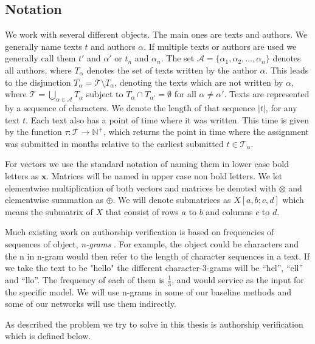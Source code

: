 \subsection{Notation} \label{subsec:notation}

We work with several different objects. The main ones are texts and authors.
We generally name texts $t$ and authors $\alpha$. If multiple texts or authors
are used we generally call them $t'$ and $\alpha'$ or $t_n$ and $\alpha_n$.
The set $\mathcal{A} = \{\alpha_1, \alpha_2, \dots, \alpha_n\}$ denotes all
authors, where $T_\alpha$ denotes the set of texts written by the author
$\alpha$. This leads to the disjunction $\overline{T_\alpha} = \mathcal{T}
\setminus T_\alpha$, denoting the texts which are not written by $\alpha$,
where $\mathcal{T} = \bigcup_{\alpha \in \mathcal{A}} T_\alpha$ subject to
$T_{\alpha} \cap T_{\alpha'} = \emptyset$ for all $\alpha \neq \alpha'$.
Texts are represented by a sequence of characters. We denote the length
of that sequence $|t|$, for any text $t$. Each text also has a point of
time where it was written. This time is given by the function $\tau \colon
\mathcal{T} \rightarrow \mathbb{N}^+$, which returns the point in time where the
assignment was submitted in months relative to the earliest submitted $t \in
\mathcal{T_\alpha}$.

For vectors we use the standard notation of naming them in lower case bold
letters as $\mathbf{x}$. Matrices will be named in upper case non bold
letters. We let elementwise multiplication of both vectors and matrices be
denoted with $\otimes$ and elementwise summation as $\oplus$. We will denote
submatrices as $X[a,b;c,d]$ which means the submatrix of $X$ that consist of
rows $a$ to $b$ and columns $c$ to $d$.

Much existing work on authorship verification is based on frequencies of
sequences of object, \textit{n-grams} \citep{stamatos2009}. For example, the
object could be characters and the n in n-gram would then refer to the length of
character sequences in a text. If we take the text to be "hello" the different
character-3-grams will be ``hel'', ``ell'' and ``llo''. The frequency of each of
them is $\frac{1}{3}$, and would service as the input for the specific model. We
will use n-grams in some of our baseline methods and some of our networks will
use them indirectly.


As described the problem we try to solve in this thesis is authorship
verification which is defined below.

